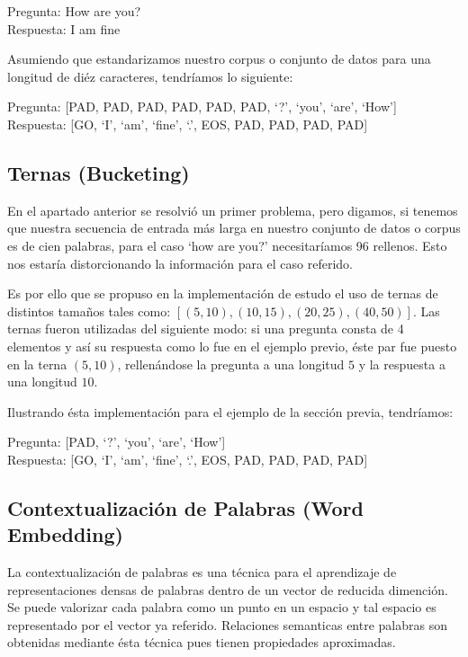 \documentclass[12pt, letterpaper]{article}
\begin{document}
    Pregunta: How are you? \\
    Respuesta: I am fine

    Asumiendo que estandarizamos nuestro corpus o conjunto de datos para una longitud de diéz caracteres, tendríamos lo siguiente:

    Pregunta: [PAD, PAD, PAD, PAD, PAD, PAD, `?', `you', `are', `How'] \\
    Respuesta: [GO, `I', `am', `fine', `.', EOS, PAD, PAD, PAD, PAD]

    \subsection{Ternas (Bucketing)}
    En el apartado anterior se resolvió un primer problema, pero digamos, si tenemos que nuestra secuencia de entrada más larga en nuestro conjunto de datos o corpus es de cien palabras, para el caso `how are you?' necesitaríamos 96 rellenos. Esto nos estaría distorcionando la información para el caso referido.

    Es por ello que se propuso en la implementación de estudo el uso de ternas de distintos tamaños tales como: $[(5,10), (10,15), (20,25), (40,50)]$. Las ternas fueron utilizadas del siguiente modo: si una pregunta consta de 4 elementos y así su respuesta como lo fue en el ejemplo previo, éste par fue puesto en la terna  $(5,10)$, rellenándose la pregunta a una longitud $5$ y la respuesta a una longitud $10$.

    Ilustrando ésta implementación para el ejemplo de la sección previa, tendríamos:

    Pregunta: [PAD, `?', `you', `are', `How']\\
    Respuesta: [GO, `I', `am', `fine', `.', EOS, PAD, PAD, PAD, PAD]

    \subsection{Contextualización de Palabras (Word Embedding)}

    La contextualización de palabras es una técnica para el aprendizaje de representaciones densas de palabras dentro de un vector de reducida dimención. Se puede valorizar cada palabra como un punto en un espacio y tal espacio es representado por el vector ya referido. Relaciones semanticas entre palabras son obtenidas mediante ésta técnica pues tienen propiedades aproximadas.
\end{document}
